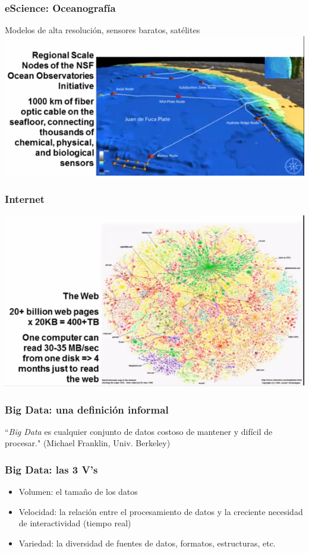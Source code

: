 \documentclass{beamer}
\begin{document}
\begin{frame}
\frametitle{eScience: Oceanograf\'ia}
Modelos de alta resoluci\'on, sensores baratos, sat\'elites
\includegraphics[scale=.5]{img/oceanografia.png}
\end{frame}

\begin{frame}

\frametitle{Internet}
\includegraphics[scale=.5]{img/web.png}

\end{frame}

\begin{frame}

\frametitle{Big Data: una definici\'on informal}
``\emph{Big Data} es cualquier conjunto de datos costoso de mantener y 
dif\'icil de procesar." (Michael Franklin, Univ. Berkeley)

\end{frame}

\begin{frame}
\frametitle{Big Data: las 3 V's}
	\begin{itemize}
	\item Volumen: el tama\~no de los datos
	\item Velocidad: la relaci\'on entre el procesamiento de datos y la 
	creciente necesidad de interactividad (tiempo real)
	\item Variedad: la diversidad de fuentes de datos, formatos, 
	estructuras, etc.
	\end{itemize}
\end{frame}
\end{document}
